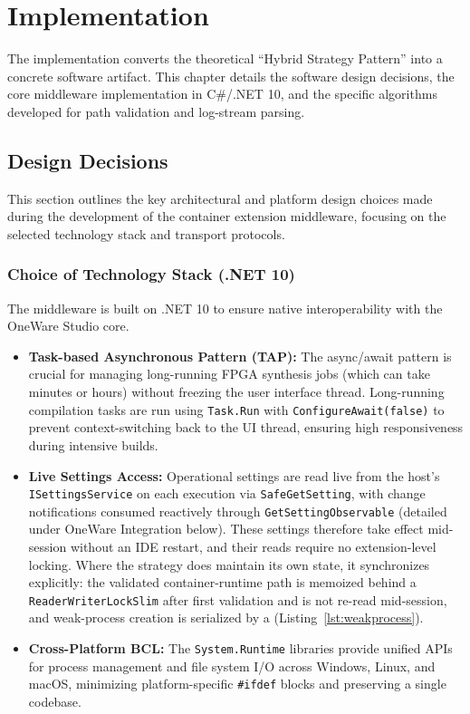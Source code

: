 
\chapter{Implementation}
\label{ch:implementation}

The implementation converts the theoretical ``Hybrid Strategy Pattern'' into a concrete software artifact. This chapter details the software design decisions, the core middleware implementation in C\#/.NET 10, and the specific algorithms developed for path validation and log-stream parsing.

\section{Design Decisions}
This section outlines the key architectural and platform design choices made during the development of the container extension middleware, focusing on the selected technology stack and transport protocols.

\subsection{Choice of Technology Stack (.NET 10)}
The middleware is built on .NET 10 to ensure native interoperability with the OneWare Studio core.
\begin{itemize}
    \item \textbf{Task-based Asynchronous Pattern (TAP):} The async/await pattern is crucial for managing long-running FPGA synthesis jobs (which can take minutes or hours) without freezing the user interface thread. Long-running compilation tasks are run using \texttt{Task.Run} with \texttt{ConfigureAwait(false)} to prevent context-switching back to the UI thread, ensuring high responsiveness during intensive builds.
    \item \textbf{Live Settings Access:} Operational settings are read live from the host's \texttt{ISettingsService} on each execution via \texttt{SafeGetSetting}, with change notifications consumed reactively through \texttt{GetSettingObservable} (detailed under OneWare Integration below). These settings therefore take effect mid-session without an IDE restart, and their reads require no extension-level locking. Where the strategy does maintain its own state, it synchronizes explicitly: the validated container-runtime path is memoized behind a \texttt{ReaderWriter\-Lock\-Slim} after first validation and is not re-read mid-session, and weak-process creation is serialized by a  (Listing~\ref{lst:weakprocess}).
    \item \textbf{Cross-Platform BCL:} The \texttt{System.Runtime} libraries provide unified APIs for process management and file system I/O across Windows, Linux, and macOS, minimizing platform-specific \texttt{\#ifdef} blocks and preserving a single codebase.
\end{itemize}

